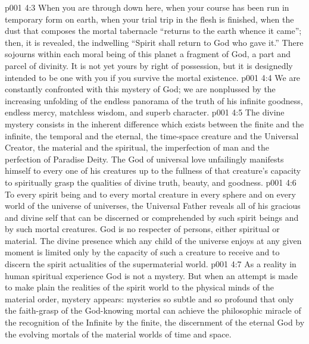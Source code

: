 \vs p001 4:3 When you are through down here, when your course has been run in temporary form on earth, when your trial trip in the flesh is finished, when the dust that composes the mortal tabernacle “returns to the earth whence it came”; then, it is revealed, the indwelling “Spirit shall return to God who gave it.” There sojourns within each moral being of this planet a fragment of God, a part and parcel of divinity. It is not yet yours by right of possession, but it is designedly intended to be one with you if you survive the mortal existence.
\vs p001 4:4 \pc We are constantly confronted with this mystery of God; we are nonplussed by the increasing unfolding of the endless panorama of the truth of his infinite goodness, endless mercy, matchless wisdom, and superb character.
\vs p001 4:5 \pc The divine mystery consists in the inherent difference which exists between the finite and the infinite, the temporal and the eternal, the time\hyp{}space creature and the Universal Creator, the material and the spiritual, the imperfection of man and the perfection of Paradise Deity. The God of universal love unfailingly manifests himself to every one of his creatures up to the fullness of that creature’s capacity to spiritually grasp the qualities of divine truth, beauty, and goodness.
\vs p001 4:6 To every spirit being and to every mortal creature in every sphere and on every world of the universe of universes, the Universal Father reveals all of his gracious and divine self that can be discerned or comprehended by such spirit beings and by such mortal creatures. God is no respecter of persons, either spiritual or material. The divine presence which any child of the universe enjoys at any given moment is limited only by the capacity of such a creature to receive and to discern the spirit actualities of the supermaterial world.
\vs p001 4:7 As a reality in human spiritual experience God is not a mystery. But when an attempt is made to make plain the realities of the spirit world to the physical minds of the material order, mystery appears: mysteries so subtle and so profound that only the faith\hyp{}grasp of the God\hyp{}knowing mortal can achieve the philosophic miracle of the recognition of the Infinite by the finite, the discernment of the eternal God by the evolving mortals of the material worlds of time and space.
